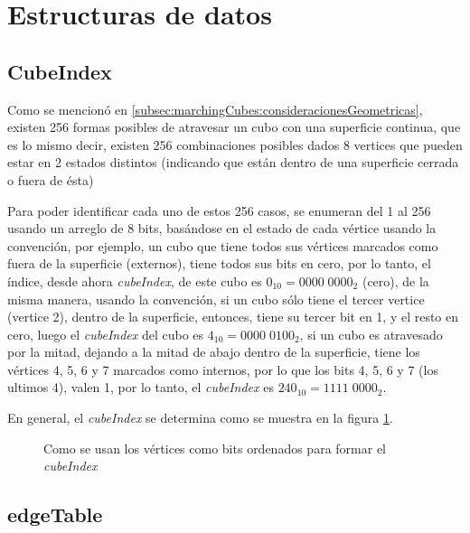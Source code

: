 \section{Estructuras de datos}
\label{ch:implementacion:sec:estructurasDeDatos}

\subsection{CubeIndex}
\label{ch:implementacion:sec:CubeIndex}

Como se mencionó en \ref{subsec:marchingCubes:consideracionesGeometricas}, existen 256 formas posibles de atravesar un cubo con una superficie continua, que es lo mismo decir, existen 256 combinaciones posibles dados 8 vertices que pueden estar en 2 estados distintos (indicando que están dentro de una superficie cerrada o fuera de ésta)

Para poder identificar cada uno de estos 256 casos, se enumeran del 1 al 256 usando un arreglo de 8 bits, basándose en el estado de cada vértice usando la convención, por ejemplo, un cubo que tiene todos sus vértices marcados como fuera de la superficie (externos), tiene todos sus bits en cero, por lo tanto, el índice, desde ahora \emph{cubeIndex}, de este cubo es \hbox{$0_{10} = 0000 \; 0000_{2}$} (cero), de la misma manera, usando la convención, si un cubo sólo tiene el tercer vertice (vertice 2), dentro de la superficie, entonces, tiene su tercer bit en 1, y el resto en cero, luego el \emph{cubeIndex} del cubo es $4_{10} = 0000 \; 0100_{2}$, si un cubo es atravesado por la mitad, dejando a la mitad de abajo dentro de la superficie, tiene los vértices 4, 5, 6 y 7 marcados como internos, por lo que los bits 4, 5, 6 y 7 (los ultimos 4), valen 1, por lo tanto, el \emph{cubeIndex} es $240_{10} = 1111 \; 0000_{2}$.

En general, el \emph{cubeIndex} se determina como se muestra en la figura \ref{f:ch:implementacion:sec:CubeIndex:cubeindex:cubeindex}.

\begin{figure}[hbt]
	\makebox[\textwidth]{\framebox[0.9\textwidth]{\rule{0pt}{0.3\textwidth}}}
	\caption{Como se usan los vértices como bits ordenados para formar el \emph{cubeIndex}}
	\label{f:ch:implementacion:sec:CubeIndex:cubeindex:cubeindex}
\end{figure}

\subsection{edgeTable}
\label{ch:implementacion:sec:edgeTable}

